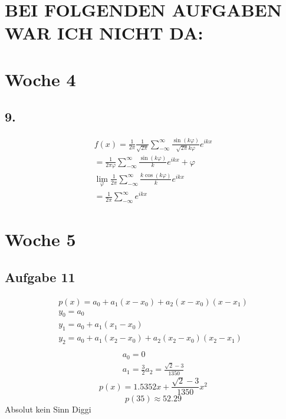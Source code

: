 \documentclass{article}
\begin{document}
\section*{BEI FOLGENDEN AUFGABEN WAR ICH NICHT DA:}

\section*{Woche 4}
    \subsection*{9.}
    \begin{eqnarray*}
        f\left(x\right)=\frac{1}{2\pi}\frac{1}{\sqrt{2\pi}}\sum_{-\infty}^{\infty} \frac{\sin(k\varphi)}{\sqrt{2\pi}k\varphi}e^{ikx}\\
            =\frac{1}{2\pi\varphi}\sum_{-\infty}^{\infty}\frac{\sin(k\varphi)}{k}e^{ikx}+\varphi\\
             \lim_{\varphi}\frac{1}{2\pi}\sum_{-\infty}^{\infty}\frac{k\cos(k\varphi)}{k}e^{ikx}\\
            =\frac{1}{2\pi}\sum_{-\infty}^{\infty}e^{ikx}
    \end{eqnarray*}

\section*{Woche 5}
\subsection*{Aufgabe 11}
\begin{eqnarray*}
    p(x) = a_0+a_1(x-x_0)+a_2(x-x_0)(x-x_1)\\
    y_0 = a_0\\
    y_1 = a_0+a_1(x_1-x_0)\\
    y_2 = a_0+a_1(x_2-x_0)+a_2(x_2-x_0)(x_2-x_1)\\
\end{eqnarray*}
\begin{eqnarray*}
    a_0 = 0\\
    a_1 = \frac{3}{2}
    a_2 = \frac{\sqrt{2}-3}{1350}
\end{eqnarray*}
\begin{equation*}
    p(x) = 1.5352x+\frac{\sqrt{2}-3}{1350}x^2
\end{equation*}
\begin{equation*}
    p(35) \approx 52.29
\end{equation*}
Absolut kein Sinn Diggi
\end{document}
